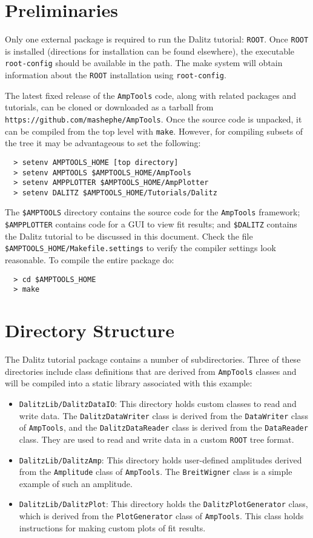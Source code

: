\documentclass[10pt]{article}
\begin{document}
\section{Preliminaries}

Only one external package is required to run the Dalitz tutorial: {\tt ROOT}. Once {\tt ROOT} is installed (directions for installation can be found elsewhere), the executable {\tt root-config} should be available in the path.  The make system will obtain information about the {\tt ROOT} installation using {\tt root-config}.

The latest fixed release of the {\tt AmpTools} code, along with related packages and tutorials, can be cloned or downloaded as a tarball from {\tt https://github.com/mashephe/AmpTools}.  Once the source code is unpacked, it can be compiled from the top level with {\tt make}.  However, for compiling subsets of the tree it may be advantageous to set the following:
\begin{verbatim}
  > setenv AMPTOOLS_HOME [top directory]
  > setenv AMPTOOLS $AMPTOOLS_HOME/AmpTools
  > setenv AMPPLOTTER $AMPTOOLS_HOME/AmpPlotter
  > setenv DALITZ $AMPTOOLS_HOME/Tutorials/Dalitz
\end{verbatim}

The {\tt \$AMPTOOLS} directory contains the source code for the {\tt AmpTools} framework;  {\tt \$AMPPLOTTER} contains code for a GUI to view fit results; and {\tt \$DALITZ} contains the Dalitz tutorial to be discussed in this document.  Check the file {\tt \$AMPTOOLS\_HOME/Makefile.settings} to verify the compiler settings look reasonable.  To compile the entire package do:
\begin{verbatim}
  > cd $AMPTOOLS_HOME
  > make
\end{verbatim}

\section{Directory Structure}

The Dalitz tutorial package contains a number of subdirectories.  Three of these directories include class definitions that are derived from {\tt AmpTools} classes and will be compiled into a static library associated with this example:
\begin{itemize}
\item {\tt DalitzLib/DalitzDataIO}:  This directory holds custom classes to read and write data.  The {\tt DalitzDataWriter} class is derived from the {\tt DataWriter} class of {\tt AmpTools}, and the {\tt DalitzDataReader} class is derived from the {\tt DataReader} class.  They are used to read and write data in a custom {\tt ROOT} tree format.
\item {\tt DalitzLib/DalitzAmp}: This directory holds user-defined amplitudes derived from the {\tt Amplitude} class of {\tt AmpTools}.  The {\tt BreitWigner} class is a simple example of such an amplitude.
\item {\tt DalitzLib/DalitzPlot}:  This directory holds the {\tt DalitzPlotGenerator} class, which is derived from the {\tt PlotGenerator} class of {\tt AmpTools}.  This class holds instructions for making custom plots of fit results.
\end{itemize}
\end{document}
